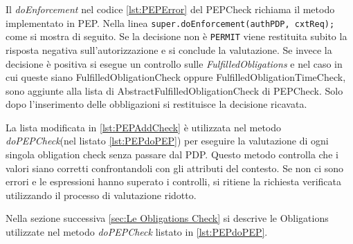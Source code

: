 Il \emph{doEnforcement} nel codice \ref{lst:PEPError} del PEPCheck richiama il metodo implementato in \ac{PEP}.
Nella linea \texttt{super.doEnforcement(authPDP, cxtReq);} come si mostra di seguito.
Se la decisione non è \texttt{PERMIT} viene restituita subito la risposta negativa sull'autorizzazione e si conclude la valutazione.
Se invece la decisione è positiva si esegue un controllo sulle \emph{FulfilledObligations} e
nel caso in cui queste siano FulfilledObligationCheck oppure FulfilledObligationTimeCheck,
sono aggiunte alla lista di AbstractFulfilledObligationCheck di PEPCheck. Solo dopo l'inserimento delle obbligazioni
si restituisce la decisione ricavata.

La lista modificata in \ref{lst:PEPAddCheck} è utilizzata nel metodo \emph{doPEPCheck}(nel listato \ref{lst:PEPdoPEP})
per eseguire la valutazione di ogni singola obligation check senza passare dal \ac{PDP}.
Questo metodo controlla che i valori siano corretti confrontandoli con gli attributi del contesto. Se non ci
sono errori e le espressioni hanno superato i controlli, si ritiene la richiesta verificata
utilizzando il processo di valutazione ridotto.

Nella sezione successiva \ref{sec:Le Obligations Check} si descrive le Obligations utilizzate
nel metodo \emph{doPEPCheck} listato in \ref{lst:PEPdoPEP}.

